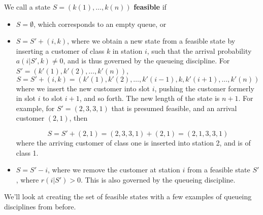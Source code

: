 \documentclass[12pt,titlepage]{article}
\newcommand{\gt}{>}
\theoremstyle{plain}
\theoremstyle{definition}
\theoremstyle{remark}
\begin{document}
We call a state $S = (k(1),\ldots,k(n))$ \textbf{feasible} if

\begin{itemize}%
\item $S = \emptyset$, which corresponds to an empty queue, or
\item $S = S' + (i,k)$, where we obtain a new state from a feasible state by inserting a customer of class $k$ in station $i$, such that the arrival probability $a(i|S',k) \neq 0$, and is thus governed by the queueing discipline. For $S' = (k'(1),k'(2),\ldots, k'(n))$,\begin{displaymath}
S = S' + (i,k) = (k'(1),k'(2),\ldots,k'(i-1),k,k'(i+1),\ldots,k'(n))
\end{displaymath}
where we insert the new customer into slot $i$, pushing the customer formerly in slot $i$ to slot $i+1$, and so forth. The new length of the state is $n+1$. For example, for $S' = (2,3,3,1)$ that is presumed feasible, and an arrival customer $(2,1)$, then

\begin{displaymath}
S = S' + (2,1) = (2,3,3,1) + (2,1) = (2,1,3,3,1)
\end{displaymath}
where the arriving customer of class one is inserted into station 2, and is of class 1.


\item $S = S'-i$, where we remove the customer at station $i$ from a feasible state $S'$, where $r(i|S') \gt 0$. This is also governed by the queueing discipline.

\end{itemize}
We'll look at creating the set of feasible states with a few examples of queueing disciplines from before.
\end{document}
